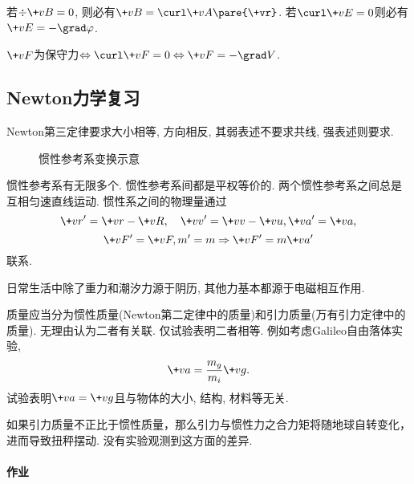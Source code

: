 \documentclass{ctexart}
\begin{document}
\begin{theorem}
    若$\div\+vB = 0$, 则必有$\+vB = \curl\+vA\pare{\+vr}$. 若$\curl\+vE = 0$则必有$\+vE = -\grad\varphi$.
\end{theorem}
\begin{sample}
    \begin{ex}
        $\+vF$为保守力$\Leftrightarrow \curl\+vF = 0 \Leftrightarrow \+vF = -\grad V$.
    \end{ex}
\end{sample}



\subsection{Newton力学复习} %
\label{sub:newton力学复习}

\begin{remark}
    Newton第三定律要求大小相等, 方向相反, 其弱表述不要求共线, 强表述则要求.
\end{remark}
\begin{figure}[ht]
    \centering
    \caption{惯性参考系变换示意}
\end{figure}
\begin{theorem}[Galileo变换]
    惯性参考系有无限多个. 惯性参考系间都是平权等价的. 两个惯性参考系之间总是互相匀速直线运动. 惯性系之间的物理量通过
    \[ \+vr' = \+vr - \+vR,\quad \+vv' = \+vv - \+vu, \+va' = \+va, \]
    \[ \+vF' = \+vF, m' = m \Rightarrow \+vF' = m\+va' \]
    联系.
\end{theorem}
\begin{remark}
    日常生活中除了重力和潮汐力源于阴历, 其他力基本都源于电磁相互作用.
\end{remark}
\begin{remark}
    质量应当分为惯性质量(Newton第二定律中的质量)和引力质量(万有引力定律中的质量). 无理由认为二者有关联. 仅试验表明二者相等. 例如考虑Galileo自由落体实验,
    \[ \+va = \frac{m_g}{m_i} \+vg. \]
    试验表明$\+va = \+vg$且与物体的大小, 结构, 材料等无关.
\end{remark}
\begin{remark}[Eötvös实验]
    如果引力质量不正比于惯性质量，那么引力与惯性力之合力矩将随地球自转变化，进而导致扭秤摆动. 没有实验观测到这方面的差异.
\end{remark}
\paragraph{作业} %
\label{par:作业}
\end{document}
